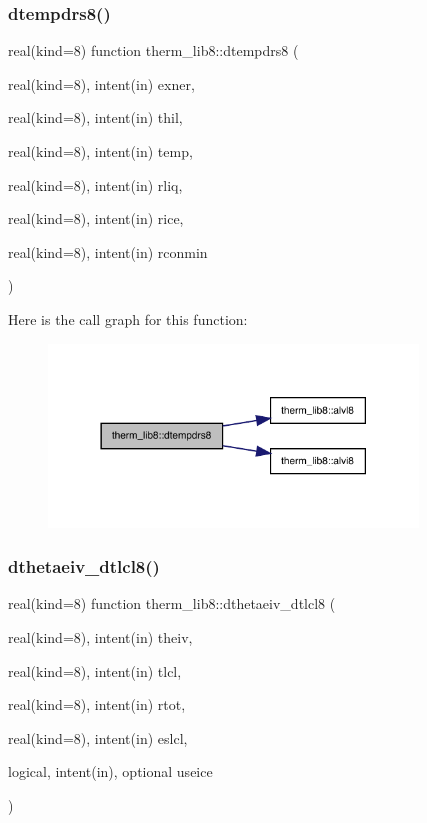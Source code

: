 \subsubsection{\texorpdfstring{dtempdrs8()}{dtempdrs8()}}
{\footnotesize\ttfamily real(kind=8) function therm\+\_\+lib8\+::dtempdrs8 (\begin{DoxyParamCaption}\item[{real(kind=8), intent(in)}]{exner,  }\item[{real(kind=8), intent(in)}]{thil,  }\item[{real(kind=8), intent(in)}]{temp,  }\item[{real(kind=8), intent(in)}]{rliq,  }\item[{real(kind=8), intent(in)}]{rice,  }\item[{real(kind=8), intent(in)}]{rconmin }\end{DoxyParamCaption})}

Here is the call graph for this function\+:
\nopagebreak
\begin{figure}[H]
\begin{center}
\leavevmode
\includegraphics[width=278pt]{namespacetherm__lib8_af3b110a715728849ed26074d4675f0e8_cgraph}
\end{center}
\end{figure}
\mbox{\label{namespacetherm__lib8_ac2831ca558c25b3522c21e3cab5ce230}} 
\subsubsection{\texorpdfstring{dthetaeiv\+\_\+dtlcl8()}{dthetaeiv\_dtlcl8()}}
{\footnotesize\ttfamily real(kind=8) function therm\+\_\+lib8\+::dthetaeiv\+\_\+dtlcl8 (\begin{DoxyParamCaption}\item[{real(kind=8), intent(in)}]{theiv,  }\item[{real(kind=8), intent(in)}]{tlcl,  }\item[{real(kind=8), intent(in)}]{rtot,  }\item[{real(kind=8), intent(in)}]{eslcl,  }\item[{logical, intent(in), optional}]{useice }\end{DoxyParamCaption})}


